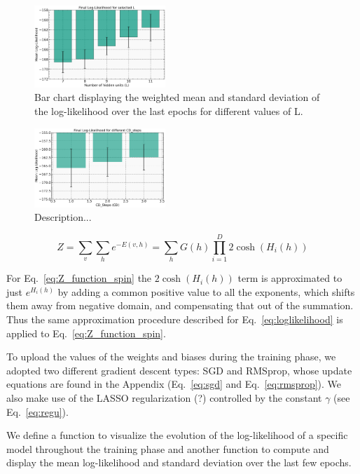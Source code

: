 \documentclass[prl,twocolumn]{revtex4-1}
\begin{document}
\begin{figure}[!tb]
	\includegraphics[width=0.44\textwidth]{L_of_L.jpg}
	\caption{Bar chart displaying the weighted mean and standard deviation of the log-likelihood over the last epochs for different values of L.}
	\label{fig:L_of_L}
\end{figure}

\begin{figure}[!tb]
	\includegraphics[width=0.44\textwidth]{final_L_of_CD.png}
	\caption{Description...}
	\label{fig:final_L_of_CD}
\end{figure}

\begin{equation}
	Z=\sum_v\sum_h{e^{-E(v,h)}}=\sum_h{G(h)\prod_{i=1}^D{2\cosh(H_i(h))}}
	\label{eq:Z_function_spin}
\end{equation}

For Eq.~\ref{eq:Z_function_spin} the $2\cosh(H_i(h))$ term is approximated to just $e^{H_i(h)}$ by adding a common positive value to all the exponents, which shifts them away from negative domain, and compensating that out of the summation. Thus the same approximation procedure described for Eq.~\ref{eq:loglikelihood} is applied to Eq.~\ref{eq:Z_function_spin}.

To upload the values of the weights and biases during the training phase, we adopted two different gradient descent types: SGD and RMSprop, whose update equations are found in the Appendix (Eq.~\ref{eq:sgd} and Eq.~\ref{eq:rmsprop}). We also make use of the LASSO regularization (?) controlled by the constant $\gamma$ (see Eq.~\ref{eq:regu}).

We define a function to visualize the evolution of the log-likelihood of a specific model throughout the training phase and another function to compute and display the mean log-likelihood and standard deviation over the last few epochs. 
\end{document}
